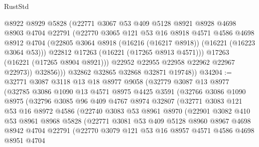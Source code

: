 \begin{lexlean}{RustStd}
\begin{coremodule}
                  @8922
                  @8929
                  @5828
                  (@22771
                    @3067
                    @53
                    @409
                    @5128
                    @8921
                    @8928
                    @4698
                    @8903
                    @4704
                    @22791
                    (@22770
                      @3065
                      @121
                      @53
                      @16
                      @8918
                      @4571
                      @4586
                      @4698
                      @8912
                      @4704
                      (@22805 @3064 @8918 (@16216 (@16217 @8918)) (@16221 (@16223 @3064 @53)))
                      @22812
                      @17263
                      (@16221 (@17265 @8913 @4571)))
                    @17263
                    (@16221 (@17265 @8904 @8921)))
                  @22952
                  @22955
                  @22958
                  @22962
                  @22967
                  @22973))
              @32856)))
        @32862
        @32865
        @32868
        @32871
        @19748))
@34204 := @32771
    @3087
    @3118
    @13
    @18
    @8977
    @9058
    (@32779
      @3087
      @13
      @8977
      (@32785
        @3086
        @1090
        @13
        @4571
        @8975
        @4425
        @3591
        (@32766
          @3086
          @1090
          @8975
          (@32796
            @3085
            @96
            @409
            @4767
            @8974
            @32807
            (@32771
              @3083
              @121
              @53
              @16
              @8972
              @4586
              (@22740
                @3083
                @53
                @8961
                @8970
                (@22901
                  @3082
                  @410
                  @53
                  @8961
                  @8968
                  @5828
                  (@22771
                    @3081
                    @53
                    @409
                    @5128
                    @8960
                    @8967
                    @4698
                    @8942
                    @4704
                    @22791
                    (@22770
                      @3079
                      @121
                      @53
                      @16
                      @8957
                      @4571
                      @4586
                      @4698
                      @8951
                      @4704

\end{coremodule}
\end{lexlean}
